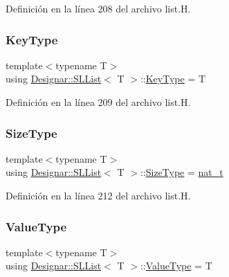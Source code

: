 Definición en la línea 208 del archivo list.\+H.

\mbox{\label{class_designar_1_1_s_l_list_a0f9ac3eaee2d1a9e6091aaaac825ccb2}} 
\subsubsection{\texorpdfstring{Key\+Type}{KeyType}}
{\footnotesize\ttfamily template$<$typename T$>$ \\
using \hyperlink{class_designar_1_1_s_l_list}{Designar\+::\+S\+L\+List}$<$ T $>$\+::\hyperlink{class_designar_1_1_s_l_list_a0f9ac3eaee2d1a9e6091aaaac825ccb2}{Key\+Type} =  T}



Definición en la línea 209 del archivo list.\+H.

\mbox{\label{class_designar_1_1_s_l_list_a253792b5e9c19ea61fb49e5e83f6159b}} 
\subsubsection{\texorpdfstring{Size\+Type}{SizeType}}
{\footnotesize\ttfamily template$<$typename T$>$ \\
using \hyperlink{class_designar_1_1_s_l_list}{Designar\+::\+S\+L\+List}$<$ T $>$\+::\hyperlink{class_designar_1_1_s_l_list_a253792b5e9c19ea61fb49e5e83f6159b}{Size\+Type} =  \hyperlink{namespace_designar_aa72662848b9f4815e7bf31a7cf3e33d1}{nat\+\_\+t}}



Definición en la línea 212 del archivo list.\+H.

\mbox{\label{class_designar_1_1_s_l_list_a22813e78b0dea3a55f47d5f476fd99a1}} 
\subsubsection{\texorpdfstring{Value\+Type}{ValueType}}
{\footnotesize\ttfamily template$<$typename T$>$ \\
using \hyperlink{class_designar_1_1_s_l_list}{Designar\+::\+S\+L\+List}$<$ T $>$\+::\hyperlink{class_designar_1_1_s_l_list_a22813e78b0dea3a55f47d5f476fd99a1}{Value\+Type} =  T}



